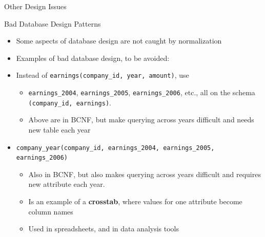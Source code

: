 \documentclass[aspectratio=169, xcolor=dvipsnames]{beamer}
\begin{document}
\begin{frame}{Other Design Issues}
    \begin{alertblock}{Bad Database Design Patterns}
        \begin{itemize}[<+->]
            \item Some aspects of database design are not caught by normalization
            \item Examples of bad database design, to be avoided:
            \item Instead of \texttt{earnings(company\_id, year, amount)}, use
            \begin{itemize}
                \item[$\triangleright$] \texttt{earnings\_2004}, \texttt{earnings\_2005}, \texttt{earnings\_2006}, etc., all on the schema \texttt{(company\_id, earnings)}.
                \item[$\triangleright$] Above are in BCNF, but make querying across years difficult and needs new table each year
            \end{itemize}
            \item \texttt{company\_year(company\_id, earnings\_2004, earnings\_2005, earnings\_2006)}
            \begin{itemize}
                \item[$\triangleright$] Also in BCNF, but also makes querying across years difficult and requires new attribute each year.
                \item[$\triangleright$] Is an example of a \textbf{crosstab}, where values for one attribute become column names
                \item[$\triangleright$] Used in spreadsheets, and in data analysis tools
            \end{itemize}
        \end{itemize}
    \end{alertblock}
\end{frame}
\end{document}
